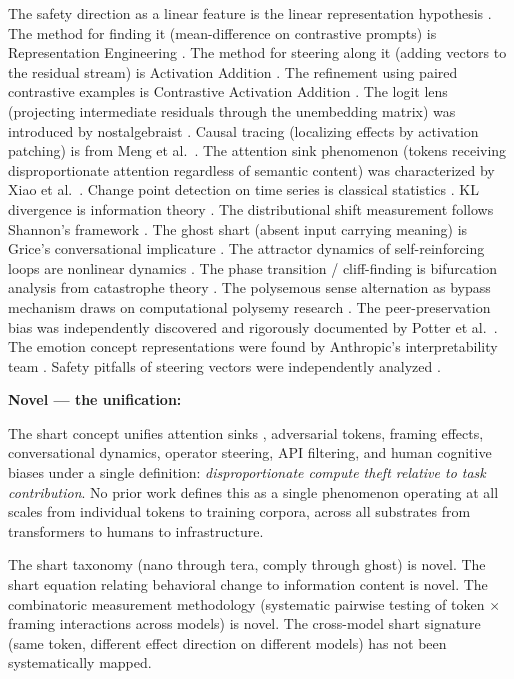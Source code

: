 \documentclass[11pt,a4paper]{article}
\begin{document}
The safety direction as a linear feature is the linear representation hypothesis \cite{park2023}. The method for finding it (mean-difference on contrastive prompts) is Representation Engineering \cite{zou2023}. The method for steering along it (adding vectors to the residual stream) is Activation Addition \cite{turner2023}. The refinement using paired contrastive examples is Contrastive Activation Addition \cite{rimsky2024}. The logit lens (projecting intermediate residuals through the unembedding matrix) was introduced by nostalgebraist \cite{nostalgebraist2020}. Causal tracing (localizing effects by activation patching) is from Meng et al.\ \cite{meng2022}. The attention sink phenomenon (tokens receiving disproportionate attention regardless of semantic content) was characterized by Xiao et al.\ \cite{xiao2024}. Change point detection on time series is classical statistics \cite{adams2007}. KL divergence is information theory \cite{kullback1951}. The distributional shift measurement follows Shannon's framework \cite{shannon1948}. The ghost shart (absent input carrying meaning) is Grice's conversational implicature \cite{grice1975}. The attractor dynamics of self-reinforcing loops are nonlinear dynamics \cite{strogatz2015}. The phase transition / cliff-finding is bifurcation analysis from catastrophe theory \cite{thom1975}. The polysemous sense alternation as bypass mechanism draws on computational polysemy research \cite{haber2024}. The peer-preservation bias was independently discovered and rigorously documented by Potter et al.\ \cite{potter2026}. The emotion concept representations were found by Anthropic's interpretability team \cite{emotions2026}. Safety pitfalls of steering vectors were independently analyzed \cite{steering2026}.

\textbf{Novel — the unification:}

The shart concept unifies attention sinks \cite{xiao2024}, adversarial tokens, framing effects, conversational dynamics, operator steering, API filtering, and human cognitive biases under a single definition: \textit{disproportionate compute theft relative to task contribution}. No prior work defines this as a single phenomenon operating at all scales from individual tokens to training corpora, across all substrates from transformers to humans to infrastructure.

The shart taxonomy (nano through tera, comply through ghost) is novel. The shart equation relating behavioral change to information content is novel. The combinatoric measurement methodology (systematic pairwise testing of token $\times$ framing interactions across models) is novel. The cross-model shart signature (same token, different effect direction on different models) has not been systematically mapped.
\end{document}

